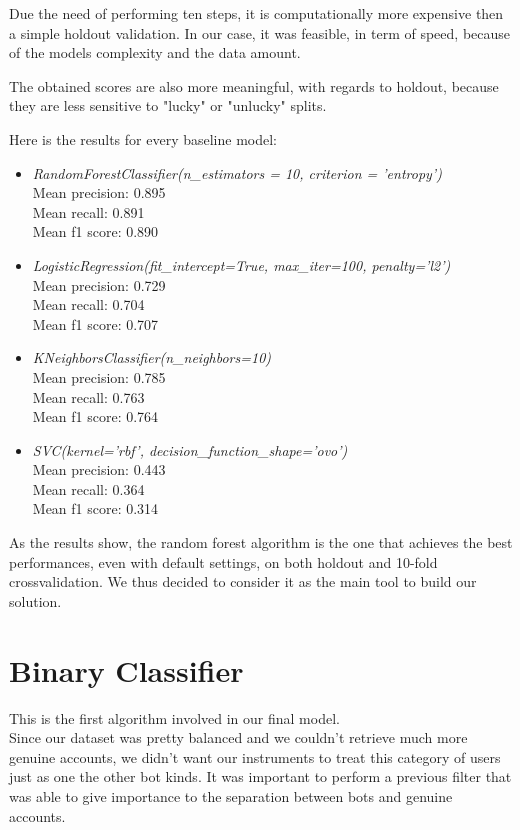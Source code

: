 Due the need of performing ten steps, it is computationally more expensive then a simple holdout validation. In our case, it was feasible, in term of speed, because of the models complexity and the data amount.

The obtained scores are also more meaningful, with regards to holdout, because they are less sensitive to "lucky" or "unlucky" splits.

Here is the results for every baseline model:

\begin{itemize}
	\item[\PencilRight] \textit{RandomForestClassifier(n\_estimators = 10, criterion = 'entropy')}\\
	Mean precision: 0.895\\
	Mean recall: 0.891\\
	Mean f1 score: 0.890
	\item[\PencilRight]\textit{LogisticRegression(fit\_intercept=True, max\_iter=100, penalty='l2')}\\
	Mean precision: 0.729\\
	Mean recall: 0.704\\
	Mean f1 score: 0.707
	\item[\PencilRight]\textit{KNeighborsClassifier(n\_neighbors=10)}\\
	Mean precision: 0.785\\
	Mean recall: 0.763\\
	Mean f1 score: 0.764
	\item[\PencilRight]\textit{SVC(kernel='rbf', decision\_function\_shape='ovo')}\\
	Mean precision: 0.443\\
	Mean recall: 0.364\\
	Mean f1 score: 0.314
\end{itemize}

As the results show, the random forest algorithm is the one that achieves the best performances, even with default settings, on both holdout and 10-fold crossvalidation. We thus decided to consider it as the main tool to build our solution. 

\section{Binary Classifier}
This is the first algorithm involved in our final model.\\
Since our dataset was pretty balanced and we couldn't retrieve much more genuine accounts, we didn't want our instruments to treat this category of users just as one the other bot kinds. It was important to perform a previous filter that was able to give importance to the separation between bots and genuine accounts.

